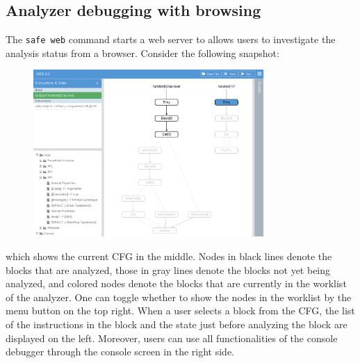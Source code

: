 \subsection{Analyzer debugging with browsing}
\label{s:3:2:2:refman}
The \verb!safe web! command starts a web server to allows
users to investigate the analysis status from a browser.
Consider the following snapshot:
\begin{figure}[H]
\includegraphics[width=8.75cm]{htmldebugger.png}
\end{figure}
\noindent
which shows the current CFG in the middle.
Nodes in black lines denote the blocks that are analyzed,
those in gray lines denote the blocks not yet being analyzed, and
colored nodes denote the blocks that are currently in the worklist of the analyzer.
One can toggle whether to show the nodes in the worklist by the menu button on the top right.
When a user selects a block from the CFG, the list of the instructions in the block
and the state just before analyzing the block are displayed on the left.
Moreover, users can use all functionalities of the console debugger
through the console screen in the right side.

